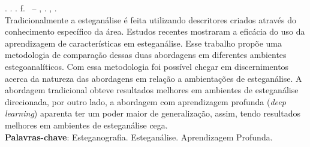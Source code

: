 
\begin{resumo}[RESUMO]
\begin{SingleSpacing}

\imprimirautorcitacao. \imprimirtitulo. \imprimirdata. \pageref {LastPage} f. \imprimirprojeto\ – \imprimirprograma, \imprimirinstituicao. \imprimirlocal, \imprimirdata.\\

Tradicionalmente a esteganálise é feita utilizando descritores criados através do conhecimento específico da área. Estudos recentes mostraram a eficácia do uso da aprendizagem de características em esteganálise. Esse trabalho propõe uma metodologia de comparação dessas duas abordagens em diferentes ambientes estegoanalíticos. Com essa metodologia foi possível chegar em discernimentos acerca da natureza das abordagens em relação a ambientações de esteganálise. A abordagem tradicional obteve resultados melhores em ambientes de esteganálise direcionada, por outro lado, a abordagem com aprendizagem profunda (\textit{deep learning}) aparenta ter um poder maior de generalização, assim, tendo resultados melhores em ambientes de esteganálise cega.\\

\textbf{Palavras-chave}: Esteganografia. Esteganálise. Aprendizagem Profunda.

\end{SingleSpacing}
\end{resumo}


